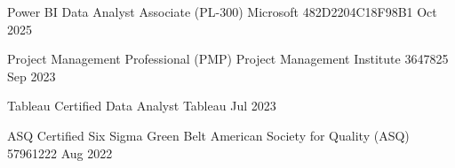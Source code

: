 

\begin{cvhonors}

\cvhonor
  {Power BI Data Analyst Associate (PL-300)} %
  {Microsoft} %
  {482D2204C18F98B1} %
  {Oct 2025} %

  \cvhonor
    {Project Management Professional (PMP)} %
    {Project Management Institute} %
    {3647825} %
    {Sep 2023} %

  \cvhonor
    {Tableau Certified Data Analyst} %
    {Tableau} %
    {} %
    {Jul 2023} %

  \cvhonor
    {ASQ Certified Six Sigma Green Belt } %
    {American Society for Quality (ASQ)} %
    {57961222} %
    {Aug 2022} %

\end{cvhonors}
